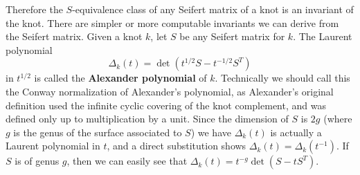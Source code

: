 Therefore the $S$-equivalence class of any Seifert matrix of a knot is an invariant of the knot. There are simpler or more computable invariants we can derive from the Seifert matrix. Given a knot $k$, let $S$ be any Seifert matrix for $k$. The Laurent polynomial 
\[ \Delta_k(t) = \det \left( t^{1/2} S - t^{-1/2} S^T \right) \]
in $t^{1/2}$ is called the \textbf{Alexander polynomial} of $k$. Technically we should call this the Conway normalization of Alexander's polynomial, as Alexander's original definition used the infinite cyclic covering of the knot complement, and was defined only up to multiplication by a unit. Since the dimension of $S$ is $2g$ (where $g$ is the genus of the surface associated to $S$) we have $\Delta_k(t)$ is actually a Laurent polynomial in $t$, and a direct substitution shows $\Delta_k(t)=\Delta_k(t^{-1})$. If $S$ is of genus $g$, then we can easily see that $\Delta_k(t) = t^{-g}\det(S-tS^T)$.


